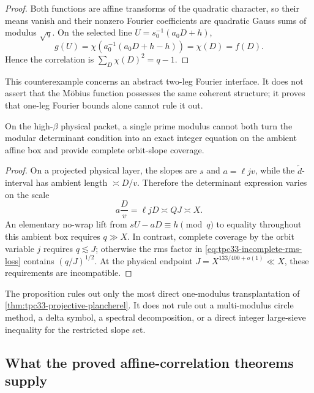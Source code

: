 \begin{proof}
Both functions are affine transforms of the quadratic character, so their
means vanish and their nonzero Fourier coefficients are quadratic Gauss
sums of modulus \(\sqrt q\).  On the selected line
\(U=s_0^{-1}(a_0D+h)\),
\[
 g(U)=\chi\!\left(a_0^{-1}(a_0D+h-h)\right)=\chi(D)=f(D).
\]
Hence the correlation is \(\sum_D\chi(D)^2=q-1\).
\end{proof}

This counterexample concerns an abstract two-leg Fourier interface.  It
does not assert that the M\"obius function possesses the same coherent
structure; it proves that one-leg Fourier bounds alone cannot rule it out.

\begin{proposition}
\label{prop:tpc33-single-modulus-conflict}
On the high-\(\beta\) physical packet, a single prime modulus cannot both
turn the modular determinant condition into an exact integer equation on
the ambient affine box and provide complete orbit-slope coverage.
\end{proposition}

\begin{proof}
On a projected physical layer, the slopes are \(s\) and
\(a=\ell jv\), while the \(\widetilde d\)-interval has ambient length
\(\asymp D/v\).  Therefore the determinant expression varies on the scale
\begin{equation}
 a\frac Dv=\ell jD\asymp QJ\asymp X.
 \label{eq:tpc33-ambient-determinant-span}
\end{equation}
An elementary no-wrap lift from
\(sU-aD\equiv h\pmod q\) to equality throughout this ambient box requires
\(q\gg X\).  In contrast, complete coverage by the orbit variable
\(j\) requires \(q\lesssim J\); otherwise the rms factor in
\eqref{eq:tpc33-incomplete-rms-loss} contains \((q/J)^{1/2}\).  At the
physical endpoint \(J=X^{133/400+o(1)}\ll X\), these requirements are
incompatible.
\end{proof}

The proposition rules out only the most direct one-modulus transplantation
of \cref{thm:tpc33-projective-plancherel}.  It does not rule out a
multi-modulus circle method, a delta symbol, a spectral decomposition, or a
direct integer large-sieve inequality for the restricted slope set.

\subsection{What the proved affine-correlation theorems supply}

